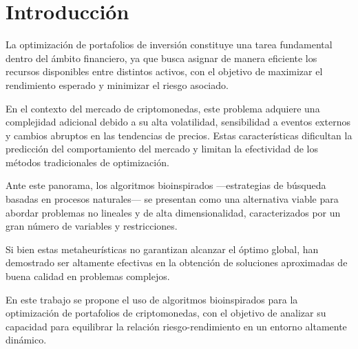 \section{Introducción}

La optimización de portafolios de inversión constituye una tarea
fundamental dentro del ámbito financiero, ya que busca asignar de
manera eficiente los recursos disponibles entre distintos activos,
con el objetivo de maximizar el rendimiento esperado y minimizar el
riesgo asociado.

En el contexto del mercado de criptomonedas, este problema adquiere
una complejidad adicional debido a su alta volatilidad, sensibilidad
a eventos externos y cambios abruptos en las tendencias de precios.
Estas características dificultan la predicción del comportamiento del
mercado y limitan la efectividad de los métodos tradicionales de optimización.

Ante este panorama, los algoritmos bioinspirados —estrategias de
búsqueda basadas en procesos naturales— se presentan como una
alternativa viable para abordar problemas no lineales y de alta
dimensionalidad, caracterizados por un gran número de variables y restricciones.

Si bien estas metaheurísticas no garantizan alcanzar el óptimo
global, han demostrado ser altamente efectivas en la obtención de
soluciones aproximadas de buena calidad en problemas complejos.

En este trabajo se propone el uso de algoritmos bioinspirados para la
optimización de portafolios de criptomonedas, con el objetivo de
analizar su capacidad para equilibrar la relación riesgo-rendimiento
en un entorno altamente dinámico.
